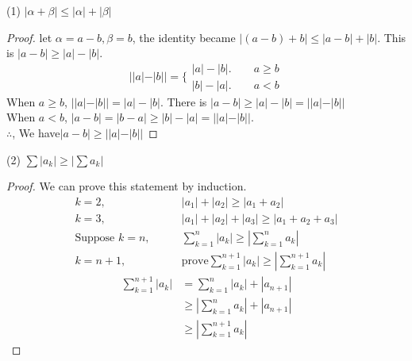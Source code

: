 \begin{example}
	(1) $ |\alpha + \beta | \le |\alpha| + |\beta|$
	\begin{proof}
		let $ \alpha = a-b, \beta = b $, the identity became $ |(a-b) + b| \le |a-b| + |b| $. This is $ |a - b| \ge |a| - |b| $.
		\begin{equation*}
			||a| - |b|| = \Big\lbrace %
			\begin{aligned}
				|a| - |b|. \qquad a \ge b\\
				|b| - |a|. \qquad a < b
			\end{aligned}
		\end{equation*}
		When $ a\ge b $, $ ||a| - |b|| = |a| - |b| $. There is $ |a-b| \ge |a| - |b| = ||a|-|b|| $\\
		When $ a < b $, $ |a-b| = |b-a| \ge |b| - |a|  = ||a|-|b|| $.\\
		$ \therefore $, We have$ |a-b| \ge ||a|-|b|| $
	\end{proof}
		
	(2) $ \sum |a_k| \ge |\sum a_k|$ 
	\begin{proof}
		We can prove this statement by induction.
		\begin{align*}
			k=2,\qquad&|a_1| + |a_2| \ge |a_1+a_2|\\
			k=3,\qquad&|a_1| + |a_2| + |a_3| \ge |a_1+a_2+a_3|\\
			\text{Suppose } k = n, \qquad & \sum_{k=1}^n |a_k| \ge |\sum_{k=1}^n a_k| \\
			k = n+1, \qquad& \text{prove}\sum_{k=1}^{n+1} |a_k| \ge |\sum_{k=1}^{n+1} a_k|
		\end{align*}
		\begin{align*}
			\sum_{k=1}^{n+1} |a_k| 
			&= \sum_{k=1}^{n} |a_k| + |a_{n+1}| \\
			&\ge |\sum_{k=1}^n a_k| + |a_{n+1}| \\
			&\ge |\sum_{k=1}^{n+1} a_k|
		\end{align*}
	

\end{proof}
\end{example}
